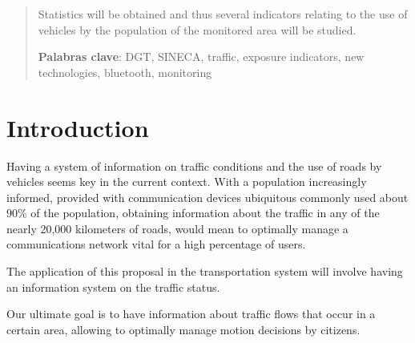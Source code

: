 \documentclass{llncs}
\begin{document}
\begin{abstract}
Statistics will be obtained and thus several indicators relating to the use of vehicles by the population of the monitored area will be studied.


{\bf Palabras clave}: DGT, SINECA, traffic, exposure indicators, new technologies, bluetooth, monitoring

\end{abstract}




\section{Introduction}

Having a system of information on traffic conditions and the use of roads by vehicles seems key in the current context. 
With a population increasingly informed, provided with communication devices ubiquitous commonly used about $ 90 \% $ of the population, obtaining information about the traffic in any of the nearly 20,000 kilometers of roads, would mean to optimally manage a communications network vital for a high percentage of users.

The application of this proposal in the transportation system will involve having an information system on the traffic status.

Our ultimate goal is to have information about traffic flows that occur in a certain area, allowing to optimally manage motion decisions by citizens.
\end{document}
